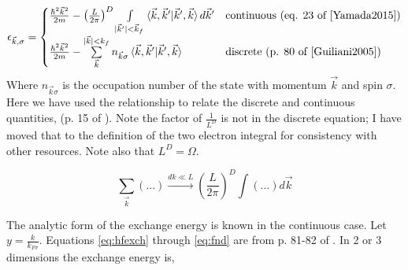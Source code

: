 \documentclass{revtex4}
\begin{document}
\begin{equation}\label{eq:hf_orb_energy}
\epsilon_{\vec{k},\sigma}=
\begin{cases}
	\frac{\hbar^2\vec{k}^2}{2m}-\left(\frac{L}{2\pi}\right)^D\int\limits_{|\vec{k}'|<\vec{k}_f}^{}\braket{\vec{k}, \vec{k}' |\vec{k}', \vec{k}}d\vec{k}'
	&\text{continuous (eq. 23 of \cite{Yamada2015})} \\
	\frac{\hbar^2\vec{k}^2}{2m} - \sum\limits_{\vec{k}}^{|\vec{k}|< k_f}n_{\vec{k}\sigma}\braket{\vec{k}, \vec{k}' |\vec{k}', \vec{k}}
	&\text{discrete (p. 80 of \cite{Guiliani2005})}
\end{cases}
\end{equation}
Where $n_{\vec{k}\sigma}$ is the occupation number of the state with momentum $\vec{k}$ and spin $\sigma$. Here we have used the relationship to relate the discrete and continuous quantities, (p. 15 of \cite{Guiliani2005}). Note the factor of $\frac{1}{L^D}$ is not in the discrete equation; I have moved that to the definition of the two electron integral for consistency with other resources. Note also that $L^D = \Omega$.

\begin{equation}
	\sum\limits_{\vec{k}}^{}{(...)}\xrightarrow{\text{$dk \ll L$}}\left(\frac{L}{2\pi}\right)^D\int (...)d\vec{k}
\end{equation}

The analytic form of the exchange energy is known in the continuous case. Let $y = \frac{k}{k_{F\sigma}}$. Equations \ref{eq:hfexch} through \ref{eq:fnd} are from p. 81-82 of \cite{Guiliani2005}. In 2 or 3 dimensions the exchange energy is, 
\end{document}
